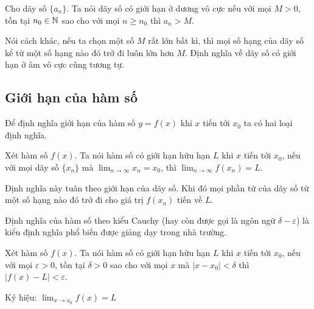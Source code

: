 \begin{definition}
    Cho dãy số $\{a_n\}$. Ta nói dãy số có giới hạn ở dương vô cực nếu với mọi $M > 0$, tồn tại $n_0 \in \mathbb{N}$ sao cho với mọi $n \geqslant n_0$ thì $a_n > M$.
\end{definition}

Nói cách khác, nếu ta chọn một số $M$ rất lớn bất kì, thì mọi số hạng của dãy số kể từ một số hạng nào đó trở đi luôn lớn hơn $M$. Định nghĩa về dãy số có giới hạn ở âm vô cực cũng tương tự.

\subsection*{Giới hạn của hàm số}

Để định nghĩa giới hạn của hàm số $y = f(x)$ khi $x$ tiến tới $x_0$ ta có hai loại định nghĩa.

\begin{definition}
    Xét hàm số $f(x)$. Ta nói hàm số có giới hạn hữu hạn $L$ khi $x$ tiến tới $x_0$, nếu với mọi dãy số $\{x_n\}$ mà $\displaystyle{\lim_{n \to \infty} x_n = x_0}$, thì  $\displaystyle{\lim_{n \to \infty} f(x_n) = L}$.
\end{definition}

Định nghĩa này tuân theo giới hạn của dãy số. Khi đó mọi phần tử của dãy số từ một số hạng nào đó trở đi cho giá trị $f(x_n)$ tiến về $L$.

Định nghĩa của hàm số theo kiểu Cauchy (hay còn được gọi là ngôn ngữ $\delta-\varepsilon$) là kiểu định nghĩa phổ biến được giảng dạy trong nhà trường.

\begin{definition}
    Xét hàm số $f(x)$. Ta nói hàm số có giới hạn hữu hạn $L$ khi $x$ tiến tới $x_0$, nếu với mọi $\varepsilon > 0$, tồn tại  $\delta > 0$ sao cho với mọi $x$ mà $| x - x_0 | < \delta$ thì $|f(x) - L| < \varepsilon$.

    Ký hiệu: $\displaystyle{\lim_{x \to x_0} f(x) = L}$
\end{definition}


